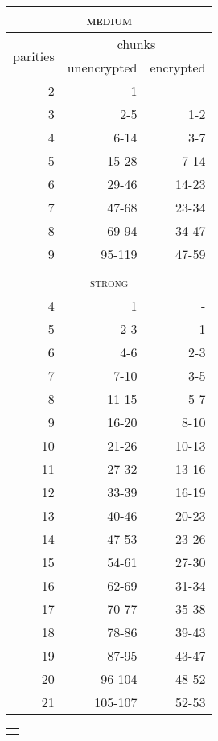 \documentclass[a4paper,11pt]{article}
\begin{document}
\begin{table}[!ht]
\begin{minipage}{.49\linewidth}
\centering
\begin{tabular}{|r|r|r|}
\multicolumn{3}{c}{\textsc{medium}}\\\hline
\multirow{2}{1.5cm}{\centering 
 parities } 
&\multicolumn{2}{|c|}{ chunks }\\\cline{2-3}
&\multicolumn{1}{|c|}{unencrypted}
&\multicolumn{1}{|c|}{encrypted} \\\hline\hline
2 & 1 & - \\
3 & 2-5     & 1-2\\
4 & 6-14    & 3-7\\ 
5 & 15-28   & 7-14\\ 
6 & 29-46   & 14-23\\  
7 & 47-68   & 23-34\\  
8 & 69-94   & 34-47\\  
9 & 95-119  & 47-59\\   
\hline
%
\multicolumn{3}{c}{\textsc{}}\\
\multicolumn{3}{c}{\textsc{strong}}
\\\hline
4 & 1   &  -\\
5 & 2-3   & 1\\
6 & 4-6   & 2-3\\
7 & 7-10  & 3-5\\
8 & 11-15 & 5-7\\
9 & 16-20 & 8-10\\
10 & 21-26 & 10-13\\
11 & 27-32 & 13-16\\
12 & 33-39 & 16-19\\
13 & 40-46 & 20-23\\
14 & 47-53 & 23-26\\
15 & 54-61 & 27-30\\
16 & 62-69 & 31-34\\
17 & 70-77 & 35-38\\
18 & 78-86 & 39-43\\
19 & 87-95 & 43-47\\
20 &96-104 & 48-52\\
21&105-107 & 52-53\\
\hline
\end{tabular}
\end{minipage}
\begin{minipage}{.49\linewidth}
\centering
\begin{tabular}{|r|r|r|}
\multicolumn{3}{c}{\textsc{}}\\

\end{tabular}
\end{minipage}
\end{table}
\end{document}
